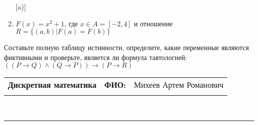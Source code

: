 \documentclass[10pt]{exam}
\newcommand{\class}{Дискретная математика}
\newcommand{\examdate}{}
\begin{document}
\begin{questions}
\begin{enumerate} [a)]
\item $F(x)=x^{2}+1$, где $x \in A = [-2, 4]$ и отношение $R = \{(a,b)|F(a) = F(b)\}$
\end{enumerate}\question Составьте полную таблицу истинности, определите, какие переменные являются фиктивными и проверьте, является ли формула тавтологией:
$(( P \rightarrow Q) \land (Q \rightarrow P)) \rightarrow (P \rightarrow R)$

\end{questions}
\newpage
\begin{flushright}
\begin{tabular}{p{2.8in} r l}
\textbf{\class} & \textbf{ФИО:} &Михеев Артем Романович
\\

\textbf{\examdate} &&\\
\end{tabular}\\
\end{flushright}
\rule[1ex]{\textwidth}{.1pt}
\end{document}
